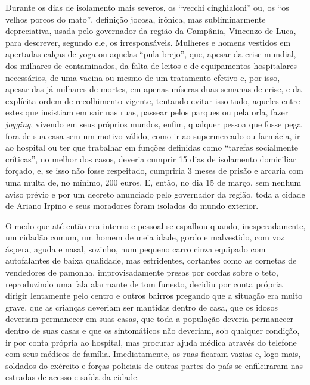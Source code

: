 Durante os dias de isolamento mais severos, os ``vecchi cinghialoni''
ou, os ``os velhos porcos do mato'', definição jocosa, irônica, mas
subliminarmente depreciativa, usada pelo governador da região da
Campânia, Vincenzo de Luca, para descrever, segundo ele, os
irresponsáveis. Mulheres e homens vestidos em apertadas calças de yoga
ou aquelas ``pula brejo'', que, apesar da crise mundial, dos milhares de
contaminados, da falta de leitos e de equipamentos hospitalares
necessários, de uma vacina ou mesmo de um tratamento efetivo e, por
isso, apesar das já milhares de mortes, em apenas míseras duas semanas
de crise, e da explícita ordem de recolhimento vigente, tentando evitar
isso tudo, aqueles entre estes que insistiam em sair nas ruas, passear
pelos parques ou pela orla, fazer \emph{jogging}, vivendo em seus
próprios mundos, enfim, qualquer pessoa que fosse pega fora de sua casa
sem um motivo válido, como ir ao supermercado ou farmácia, ir ao
hospital ou ter que trabalhar em funções definidas como ``tarefas
socialmente críticas'', no melhor dos casos, deveria cumprir 15 dias de
isolamento domiciliar forçado, e, se isso não fosse respeitado,
cumpriria 3 meses de prisão e arcaria com uma multa de, no mínimo, 200
euros. E, então, no dia 15 de março, sem nenhum aviso prévio e por um
decreto anunciado pelo governador da região, toda a cidade de Ariano
Irpino e seus moradores foram isolados do mundo exterior.

O medo que até então era interno e pessoal se espalhou quando,
inesperadamente, um cidadão comum, um homem de meia idade, gordo e
malvestido, com voz áspera, aguda e nasal, sozinho, num pequeno carro
cinza equipado com autofalantes de baixa qualidade, mas estridentes,
cortantes como as cornetas de vendedores de pamonha, improvisadamente
presas por cordas sobre o teto, reproduzindo uma fala alarmante de tom
funesto, decidiu por conta própria dirigir lentamente pelo centro e
outros bairros pregando que a situação era muito grave, que as crianças
deveriam ser mantidas dentro de casa, que os idosos deveriam permanecer
em suas casas, que toda a população deveria permanecer dentro de suas
casas e que os sintomáticos não deveriam, sob qualquer condição, ir por
conta própria ao hospital, mas procurar ajuda médica através do telefone
com seus médicos de família. Imediatamente, as ruas ficaram vazias e,
logo mais, soldados do exército e forças policiais de outras partes do
país se enfileiraram nas estradas de acesso e saída da cidade.

